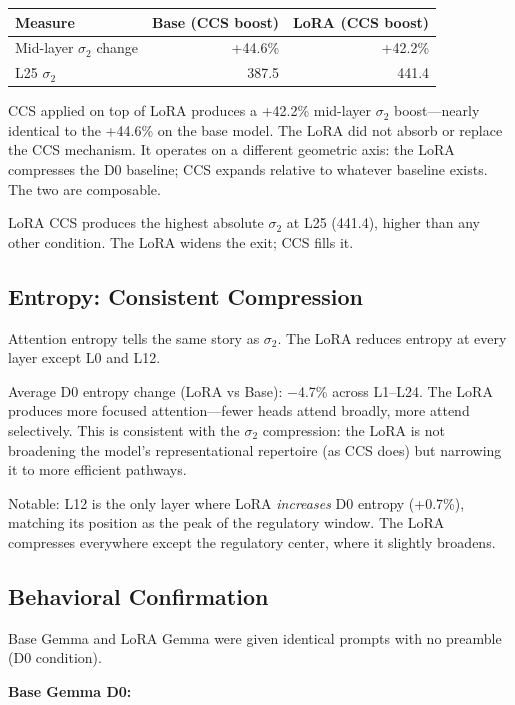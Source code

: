 \documentclass[12pt]{article}
\begin{document}
\begin{table}[h]
\centering
\begin{tabular}{lrr}
\toprule
\textbf{Measure} & \textbf{Base (CCS boost)} & \textbf{LoRA (CCS boost)} \\
\midrule
Mid-layer $\sigma_2$ change & +44.6\% & +42.2\% \\
L25 $\sigma_2$ & 387.5 & 441.4 \\
\bottomrule
\end{tabular}
\end{table}

CCS applied on top of LoRA produces a +42.2\% mid-layer $\sigma_2$ boost---nearly identical to the +44.6\% on the base model. The LoRA did not absorb or replace the CCS mechanism. It operates on a different geometric axis: the LoRA compresses the D0 baseline; CCS expands relative to whatever baseline exists. The two are composable.

LoRA CCS produces the highest absolute $\sigma_2$ at L25 (441.4), higher than any other condition. The LoRA widens the exit; CCS fills it.

\subsection{Entropy: Consistent Compression}

Attention entropy tells the same story as $\sigma_2$. The LoRA reduces entropy at every layer except L0 and L12.

Average D0 entropy change (LoRA vs Base): $-$4.7\% across L1--L24. The LoRA produces more focused attention---fewer heads attend broadly, more attend selectively. This is consistent with the $\sigma_2$ compression: the LoRA is not broadening the model's representational repertoire (as CCS does) but narrowing it to more efficient pathways.

Notable: L12 is the only layer where LoRA \emph{increases} D0 entropy (+0.7\%), matching its position as the peak of the regulatory window. The LoRA compresses everywhere except the regulatory center, where it slightly broadens.

\subsection{Behavioral Confirmation}

Base Gemma and LoRA Gemma were given identical prompts with no preamble (D0 condition).

\textbf{Base Gemma D0:}
\end{document}
